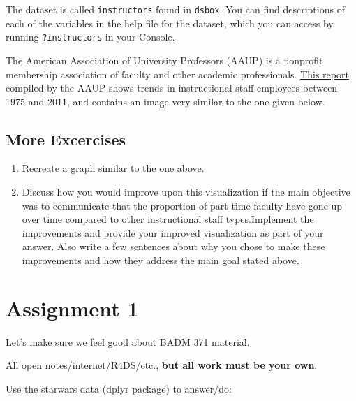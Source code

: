 \documentclass[
]{book}
\begin{document}
The dataset is called \texttt{instructors} found in \texttt{dsbox}. You can find descriptions of each of the variables in the help file for the dataset, which you can access by running \texttt{?instructors} in your Console.

The American Association of University Professors (AAUP) is a nonprofit membership association of faculty and other academic professionals. \href{https://www.aaup.org/sites/default/files/files/AAUP_Report_InstrStaff-75-11_apr2013.pdf}{This report} compiled by the AAUP shows trends in instructional staff employees between 1975 and 2011, and contains an image very similar to the one given below.

\hypertarget{more-excercises}{%
\section{More Excercises}\label{more-excercises}}

\begin{enumerate}
\def\labelenumi{\arabic{enumi}.}
\setcounter{enumi}{7}
\item
  Recreate a graph similar to the one above.
\item
  Discuss how you would improve upon this visualization if the main objective was to communicate that the proportion of part-time faculty have gone up over time compared to other instructional staff types.Implement the improvements and provide your improved visualization as part of your answer. Also write a few sentences about why you chose to make these improvements and how they address the main goal stated above.
\end{enumerate}

\hypertarget{assignment-1}{%
\chapter{Assignment 1}\label{assignment-1}}

Let's make sure we feel good about BADM 371 material.

All open notes/internet/R4DS/etc., \textbf{but all work must be your own}.

Use the starwars data (dplyr package) to answer/do:
\end{document}
